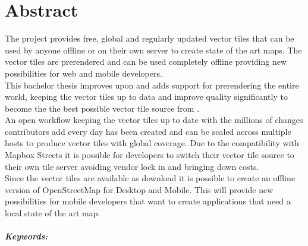 

\begingroup
\let\clearpage\relax
\let\cleardoublepage\relax
\let\cleardoublepage\relax

\chapter*{Abstract} %

The \osmvt{} project provides free, global and regularly updated vector tiles that can be used by anyone offline or on their own server to create
state of the art maps. The vector tiles are prerendered and can be used completely offline providing new possibilities for web and mobile developers. \\

This bachelor thesis improves upon \osmvt{} and adds support for prerendering the entire world, keeping the vector tiles up to data and improve quality significantly to become the the best possible vector tile source from \osm{}. \\  

An open workflow keeping the vector tiles up to date with the millions of changes \osm{} contributors add every day has been created and can be scaled across multiple hosts to produce vector tiles with global coverage.
Due to the compatibility with Mapbox Streets it is possible for developers to switch their vector tile source
to their own tile server avoiding vendor lock in and bringing down costs. \\

Since the  vector tiles are available as download it is possible to create an offline version of OpenStreetMap for Desktop and Mobile. This will provide new possibilities for mobile developers that want to create applications that need a local state of the art map.

\endgroup			

\paragraph{Keywords:}\mbox{}\\
\textit{\myKeywords}

\vfill
